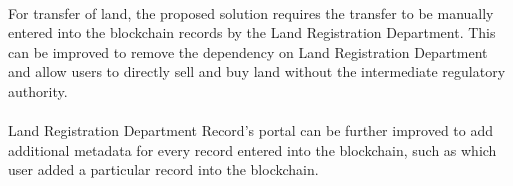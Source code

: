 \documentclass[12pt]{article}
\begin{document}
            \paragraph{}
            For transfer of land, the proposed solution requires the transfer to be manually entered into the blockchain records by the Land Registration Department. This can be improved to remove the dependency on Land Registration Department and allow users to directly sell and buy land without the intermediate regulatory authority.

            \paragraph{}
            Land Registration Department Record's portal can be further improved to add additional metadata for every record entered into the blockchain, such as which user added a particular record into the blockchain.
    
    \clearpage
    
    
\end{document}
